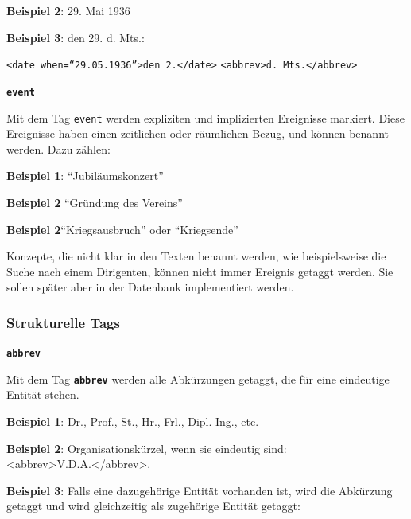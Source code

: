 \documentclass[12pt, a4paper, ngerman, bidi=default]{article}
\begin{document}
\begin{description}
\begin{description}
    \textbf{ Beispiel 2}: 29. Mai 1936

    \textbf{ Beispiel 3}: den 29. d. Mts.:

    \colorbox{VeryLightGray}{\texttt{\textless date when=\enquote{29.05.1936}\textgreater den 2.\textless /date\textgreater} \texttt{\textless abbrev\textgreater d. Mts.\textless /abbrev\textgreater}}

    \item\texttt{\textbf{{\colorbox{eventTag}{event}}}}
    
    Mit dem Tag \texttt{\colorbox{eventTag}{event}} werden expliziten und implizierten Ereignisse markiert. Diese Ereignisse haben einen zeitlichen oder räumlichen Bezug, und können benannt werden. Dazu zählen:

    \noindent \textbf{ Beispiel 1}: \enquote{Jubiläumskonzert}

    \textbf{ Beispiel 2} \enquote{Gründung des Vereins} 

    \textbf{ Beispiel 2}\enquote{Kriegsausbruch} oder \enquote{Kriegsende}

    Konzepte, die nicht klar in den Texten benannt werden, wie beispielsweise die Suche nach einem Dirigenten, können nicht immer Ereignis getaggt werden. Sie sollen später aber in der Datenbank implementiert werden.
    \end{description}
    
    \subsubsection{Strukturelle Tags}
    \begin{description}

    \item\texttt{\textbf{{\colorbox{abbrev}{abbrev}}}}
    
        
    Mit dem Tag \texttt{\texttt{\textbf{{\colorbox{abbrev}{abbrev}}}}} werden alle Abkürzungen getaggt, die für eine eindeutige Entität stehen.

    
    \noindent\textbf{ Beispiel 1}: Dr., Prof., St., Hr., Frl., Dipl.-Ing., etc.

    \textbf{ Beispiel 2}: Organisationskürzel, wenn sie eindeutig sind:\\\colorbox{VeryLightGray}{\textless abbrev\textgreater V.D.A.\textless /abbrev\textgreater}.

    \textbf{\textbf{ Beispiel 3}}: Falls eine dazugehörige Entität vorhanden ist, wird die Abkürzung getaggt und wird gleichzeitig als zugehörige Entität getaggt:


\end{description}
\end{description}
\end{document}
